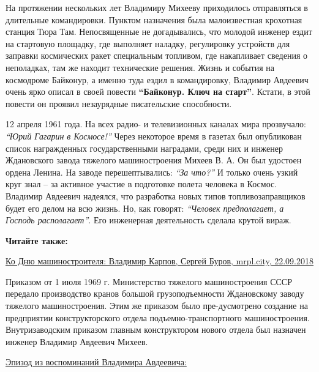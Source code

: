 На протяжении нескольких лет Владимиру Михееву приходилось отправляться в
длительные командировки. Пунктом назначения была малоизвестная крохотная
станция Тюра Там. Непосвященные не догадывались, что молодой инженер ездит на
стартовую площадку, где выполняет наладку, регулировку устройств для заправки
космических ракет специальным топливом, где накапливает сведения о неполадках,
там же находит технические решения. Жизнь и события на космодроме Байконур, а
именно туда ездил в командировку, Владимир Авдеевич очень ярко описал в своей
повести \textbf{\enquote{Байконур. Ключ на старт}}. Кстати, в этой повести он проявил
незаурядные писательские способности.


12 апреля 1961 года. На всех радио- и телевизионных каналах мира прозвучало:
\emph{\enquote{Юрий Гагарин в Космосе!}} Через некоторое время в газетах был опубликован
список награжденных государственными наградами, среди них и инженер Ждановского
завода тяжелого машиностроения Михеев В. А. Он был удостоен ордена Ленина. На
заводе перешептывались: \emph{\enquote{За что?}} И только очень узкий круг знал – за активное
участие в подготовке полета человека в Космос. Владимир Авдеевич надеялся, что
разработка новых типов топливозаправщиков будет его делом на всю жизнь. Но, как
говорят: \emph{\enquote{Человек предполагает, а Господь располагает}}. Его инженерная
деятельность сделала крутой вираж. 

\vspace{0.5cm}
\begin{minipage}{0.9\textwidth}
\textbf{Читайте также:}

\href{https://archive.org/details/22_09_2018.sergij_burov.mrpl_city.ko_dnju_mashinostroenia_vladimir_karpov}{%
Ко Дню машиностроителя: Владимир Карпов, Сергей Буров, mrpl.city, 22.09.2018}
\end{minipage}
\vspace{0.5cm}

Приказом от 1 июля 1969 г. Министерство тяжелого машиностроения СССР передало
производство кранов большой грузоподъемности Ждановскому заводу тяжелого
машиностроения. Этим же приказом было пре\hyp{}дусмотрено создание на предприятии
конструкторского отдела подъемно-транспортного машиностроения. Внутризаводским
приказом главным конструктором нового отдела был назначен инженер Владимир
Авдеевич Михеев.

\underline{Эпизод из воспоминаний Владимира Авдеевича:}

